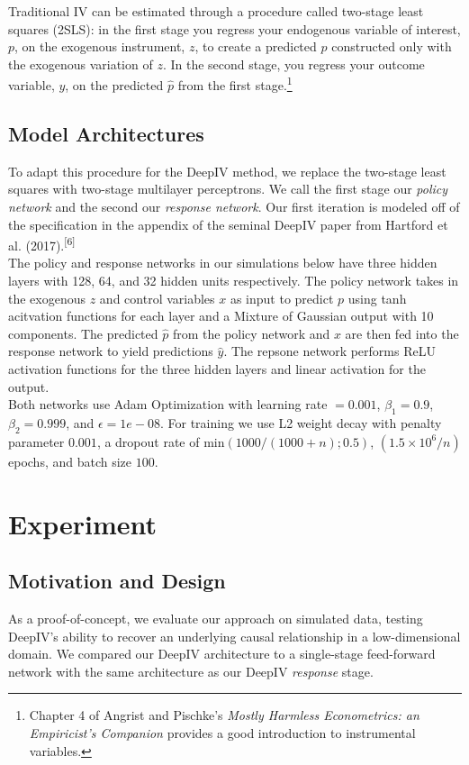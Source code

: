 \documentclass[11pt, oneside, twocolumn]{article}   	%
\begin{document}
Traditional IV can be estimated through a procedure called two-stage least squares (2SLS): in the first stage you regress your endogenous variable of interest, $p$,  on the exogenous instrument, $z$, to create a predicted $\hat{p}$ constructed only with the exogenous variation of $z$. In the second stage, you regress your outcome variable, $y$, on the predicted $\hat{p}$ from the first stage.\footnote{Chapter 4 of Angrist and Pischke's \emph{Mostly Harmless Econometrics: an Empiricist's Companion} provides a good introduction to instrumental variables.}\\

\subsection{Model Architectures}

To adapt this procedure for the DeepIV method, we replace the two-stage least squares with two-stage multilayer perceptrons. We call the first stage our \emph{policy network} and the second our \emph{response network}. Our first iteration is modeled off of the specification in the appendix of the seminal DeepIV paper from Hartford et al. (2017).\textsuperscript{[6]}\\

The policy and response networks in our simulations below have three hidden layers with 128, 64, and 32 hidden units respectively. The policy network takes in the exogenous $z$ and control variables $x$ as input to predict $p$ using tanh acitvation functions for each layer and a Mixture of Gaussian output with 10 components. The predicted $\hat{p}$ from the policy network and $x$ are then fed into the response network to yield predictions $\hat{y}$. The repsone network performs ReLU activation functions for the three hidden layers and linear activation for the output. \\

Both networks use Adam Optimization with learning rate $=0.001$, $\beta_1 = 0.9$, $\beta_2 = 0.999$, and $\epsilon = 1e-08$. For training we use L2 weight decay with penalty parameter $0.001$, a dropout rate of $\textrm{min}(1000/(1000+n); 0.5)$, $(1.5 \times 10^6/n)$ epochs, and batch size $100$. 


\section{Experiment}
\subsection{Motivation and Design}
As a proof-of-concept, we evaluate our approach on simulated data, testing DeepIV's ability to recover an underlying causal relationship in a low-dimensional domain. We compared our DeepIV architecture to a single-stage feed-forward network with the same architecture as our  DeepIV \emph{response} stage. 
\end{document}
